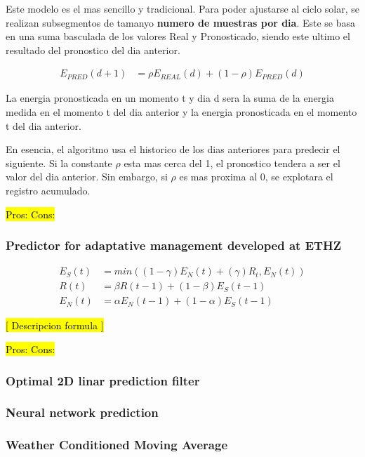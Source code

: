 Este modelo es el mas sencillo y tradicional. Para poder ajustarse al ciclo solar, se realizan subsegmentos de tamanyo \textbf{numero de muestras por dia}. 
Este se basa en una suma basculada de los valores Real y Pronosticado, siendo este ultimo el resultado del pronostico del dia anterior.

\begin{align}
	E_{PRED}(d+1) &= \rho E_{REAL}(d) + (1-\rho) E_{PRED}(d)
\end{align}

La energia pronosticada en un momento t y dia d sera la suma de la energia medida en el momento t del dia anterior y la energia pronosticada en el momento t del dia anterior.

En esencia, el algoritmo usa el historico de los dias anteriores para predecir el siguiente. Si la constante $\rho$ esta mas cerca del 1, el pronostico tendera a ser el valor del dia anterior. Sin embargo, si $\rho$ es mas proxima al 0, se explotara el registro acumulado. 

\hl{
Pros:
Cons: 
}

\subsubsection{ Predictor for adaptative management developed at ETHZ} %
\label{ssub:subsubsection_name}


\begin{align}
	E_{S}(t) &= min( (1-\gamma) E_{N}(t) + (\gamma) R_{t}, E_N(t) ) \\
	R(t) &= \beta R(t-1) + (1-\beta) E_S(t-1) \\
	E_N(t) &= \alpha E_N(t-1) + (1-\alpha) E_S(t-1)
\end{align}

\hl{[ Descripcion formula ]}



\hl{
Pros:
Cons: 
}
\subsubsection{ Optimal 2D linar prediction filter} %
\label{ssub:subsubsection_name}

\subsubsection{ Neural network prediction} %
\label{ssub:subsubsection_name}

\subsubsection{ Weather Conditioned Moving Average} %
\label{ssub:subsubsection_name}

